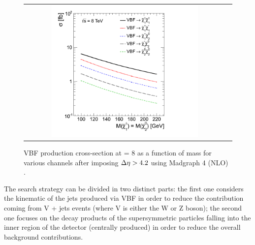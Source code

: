 \begin{figure}[tbh!]
	\centering
	\begin{tabular}{cc}
		\includegraphics[width=0.75\textwidth]{analysis/pics/VBFXsection.png}
	\end{tabular}
	\caption{VBF production cross-section at \CM = 8 \tev as a function of mass for various channels after imposing \ensuremath{\deltaeta > 4.2} using Madgraph 4 (NLO) \cite{Dutta:2012xe}.}
	\label{fig:VBF_xsec}
\end{figure}

The search strategy can be divided in two distinct parts: the first one considers the kinematic of the jets produced via VBF in order to reduce the contribution coming  from V + jets events (where V is either the W or Z boson); the second one focuses on the decay products of the supersymmetric particles falling into the inner region of the detector (centrally produced) in order to reduce the overall background contributions.

